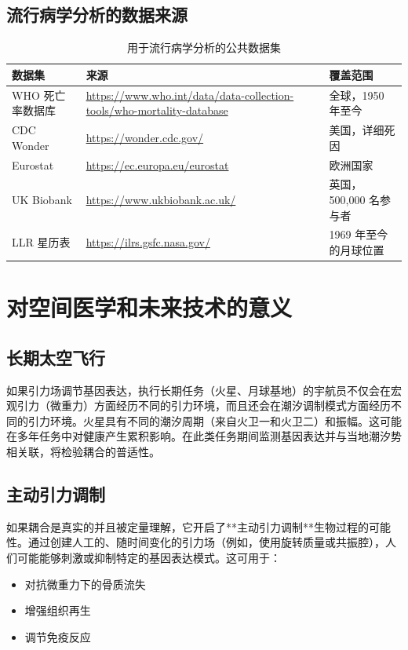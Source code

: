 \documentclass[12pt,a4paper]{article}
\theoremstyle{remark}
\begin{document}
	\subsection{流行病学分析的数据来源}
	
	\begin{table}[htbp]
		\centering
		\caption{用于流行病学分析的公共数据集}
		\label{tab:data-sources}
		\small
		\begin{tabular}{p{3.2cm}p{6.5cm}p{2.8cm}}
			\toprule
			\textbf{数据集} & \textbf{来源} & \textbf{覆盖范围} \\
			\midrule
			WHO 死亡率数据库 & 
			\url{https://www.who.int/data/data-collection-tools/who-mortality-database} & 
			全球，1950 年至今 \\
			CDC Wonder & 
			\url{https://wonder.cdc.gov/} & 
			美国，详细死因 \\
			Eurostat & 
			\url{https://ec.europa.eu/eurostat} & 
			欧洲国家 \\
			UK Biobank & 
			\url{https://www.ukbiobank.ac.uk/} & 
			英国，500,000 名参与者 \\
			LLR 星历表 & 
			\url{https://ilrs.gsfc.nasa.gov/} & 
			1969 年至今的月球位置 \\
			\bottomrule
		\end{tabular}
	\end{table}
	
	\section{对空间医学和未来技术的意义}
	\label{sec:applications}
	
	\subsection{长期太空飞行}
	
	如果引力场调节基因表达，执行长期任务（火星、月球基地）的宇航员不仅会在宏观引力（微重力）方面经历不同的引力环境，而且还会在潮汐调制模式方面经历不同的引力环境。火星具有不同的潮汐周期（来自火卫一和火卫二）和振幅。这可能在多年任务中对健康产生累积影响。在此类任务期间监测基因表达并与当地潮汐势相关联，将检验耦合的普适性。
	
	\subsection{主动引力调制}
	
	如果耦合是真实的并且被定量理解，它开启了**主动引力调制**生物过程的可能性。通过创建人工的、随时间变化的引力场（例如，使用旋转质量或共振腔），人们可能能够刺激或抑制特定的基因表达模式。这可用于：
	\begin{itemize}
		\item 对抗微重力下的骨质流失
		\item 增强组织再生
		\item 调节免疫反应
	\end{itemize}
	
\end{document}
